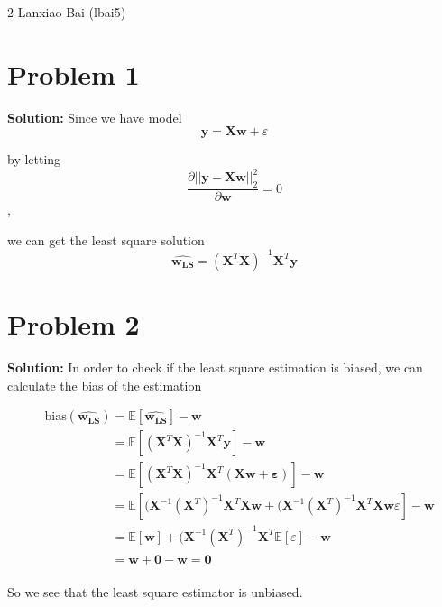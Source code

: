 \documentclass[11pt]{article}
\begin{document}
\homework
    {2}
    {Lanxiao Bai (lbai5)}
    {}

\section*{Problem 1}
\textbf{Solution:} 
	Since we have model
	\[\mathbf{y} = \mathbf{Xw} + \varepsilon\]
	
	by letting
	\[\frac{\partial ||\mathbf{y} - \mathbf{Xw}||^2_2}{\partial\mathbf{w}} = 0\],
	
	we can get the least square solution
	\[\hat{\mathbf{w_{LS}}} = (\mathbf{X}^T\mathbf{X})^{-1}\mathbf{X}^T\mathbf{y}\]
\section*{Problem 2}
\textbf{Solution:} 
 In order to check if the least square estimation is biased, we can calculate the bias of the estimation
 
 \begin{align}
 	&\text{bias}(\hat{\mathbf{w_{LS}}}) = \mathbb{E}[\hat{\mathbf{w_{LS}}}] - \mathbf{w}\nonumber\\
 	&\phantom{\text{bias}(\hat{\mathbf{w_{LS}}})} = \mathbb{E}[(\mathbf{X}^T\mathbf{X})^{-1}\mathbf{X}^T\mathbf{y}] - \mathbf{w}\nonumber\\
 	&\phantom{\text{bias}(\hat{\mathbf{w_{LS}}})} = \mathbb{E}[(\mathbf{X}^T\mathbf{X})^{-1}\mathbf{X}^T(\mathbf{Xw + \varepsilon})] - \mathbf{w}\nonumber\\
 	&\phantom{\text{bias}(\hat{\mathbf{w_{LS}}})} = \mathbb{E}[(\mathbf{X}^{-1}(\mathbf{X}^T)^{-1}\mathbf{X}^T\mathbf{Xw} + (\mathbf{X}^{-1}(\mathbf{X}^T)^{-1}\mathbf{X}^T\mathbf{Xw}\varepsilon] - \mathbf{w}\nonumber\\
 	&\phantom{\text{bias}(\hat{\mathbf{w_{LS}}})} = \mathbb{E}[\mathbf{w}] + (\mathbf{X}^{-1}(\mathbf{X}^T)^{-1}\mathbf{X}^T\mathbb{E}[\varepsilon] - \mathbf{w}\nonumber\\
 	&\phantom{\text{bias}(\hat{\mathbf{w_{LS}}})} = \mathbf{w} + \mathbf{0} - \mathbf{w} = \mathbf{0}\nonumber
 \end{align}
 
 So we see that the least square estimator is unbiased.
\end{document}
